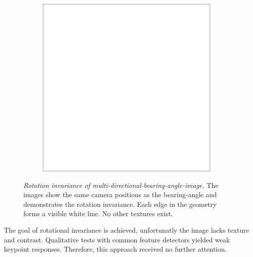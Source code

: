 \begin{figure}[H]
\begin{subfigure}[t]{0.32\textwidth}
    \end{subfigure}
    \begin{subfigure}[t]{0.32\textwidth}
        \includegraphics[width=\linewidth]{chapter04/img/max-0210.png}
    \end{subfigure}
    \caption[Rotation invariance of \gls{multi-directional-bearing-angle-image}]{\emph{Rotation invariance of \gls{multi-directional-bearing-angle-image}.} The images show the same camera positions as the \gls{bearing-angle} and demonstrates the rotation invariance. Each edge in the geometry forms a visible white line. No other textures exist.}\label{fig:max-curve-images}
\end{figure}
\vspace{-5mm}
The goal of rotational invariance is achieved, unfortunatly the image lacks texture and contrast.
Qualitative tests with common feature detectors yielded weak keypoint responses.
Therefore, this approach received no further attention.
